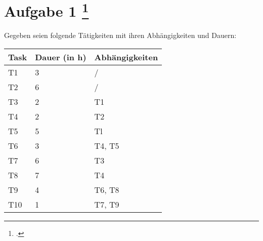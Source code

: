 \documentclass{lehramt-informatik-aufgabe}
\begin{document}
\section{Aufgabe 1
\footcite{66116:2021:03}}

Gegeben seien folgende Tätigkeiten mit ihren Abhängigkeiten und Dauern:

\begin{center}
\begin{tabular}{lll}
\hline
Task & Dauer (in h) & Abhängigkeiten \\\hline
T1   & 3            & / \\
T2   & 6            & / \\
T3   & 2            & T1 \\
T4   & 2            & T2 \\
T5   & 5            & Tl \\
T6   & 3            & T4, T5 \\
T7   & 6            & T3 \\
T8   & 7            & T4 \\
T9   & 4            & T6, T8 \\
T10  & 1            & T7, T9 \\\hline
\end{tabular}
\end{center}
\end{document}
